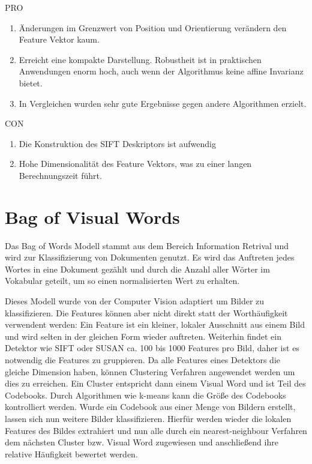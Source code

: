 PRO

\begin{enumerate}
	\item Änderungen im Grenzwert von Position und Orientierung verändern den Feature Vektor kaum.
	\item Erreicht eine kompakte Darstellung. Robustheit ist in praktischen Anwendungen enorm hoch, auch wenn der Algorithmus keine affine Invarianz bietet.
	\item In Vergleichen wurden sehr gute Ergebnisse gegen andere Algorithmen erzielt.
\end{enumerate}

CON

\begin{enumerate}
	\item Die Konstruktion des SIFT Deskriptors ist aufwendig
	\item Hohe Dimensionalität des Feature Vektors, was zu einer langen Berechnungszeit führt.
\end{enumerate}

\section{Bag of Visual Words}

Das Bag of Words Modell stammt aus dem Bereich Information Retrival und wird zur Klassifizierung von Dokumenten genutzt. Es wird das Auftreten jedes Wortes in eine Dokument gezählt und durch die Anzahl aller Wörter im Vokabular geteilt, um so einen normalisierten Wert zu erhalten.

Dieses Modell wurde von der Computer Vision adaptiert um Bilder zu klassifizieren. Die Features können aber nicht direkt statt der Worthäufigkeit verwendent werden: Ein Feature ist ein kleiner, lokaler Ausschnitt aus einem Bild und wird selten in der gleichen Form wieder auftreten. Weiterhin findet ein Detektor wie SIFT oder SUSAN ca. 100 bis 1000 Features pro Bild, daher ist es notwendig die Features zu gruppieren. Da alle Features eines Detektors die gleiche Dimension haben, können Clustering Verfahren angewendet werden um dies zu erreichen. Ein Cluster entspricht dann einem Visual Word und ist Teil des Codebooks. Durch Algorithmen wie k-means kann die Größe des Codebooks kontrolliert werden. Wurde ein Codebook aus einer Menge von Bildern erstellt, lassen sich nun weitere Bilder klassifizieren. Hierfür werden wieder die lokalen Features des Bildes extrahiert und nun alle durch ein nearest-neighbour Verfahren dem nächsten Cluster bzw. Visual Word zugewiesen und anschließend ihre relative Häufigkeit bewertet werden.

